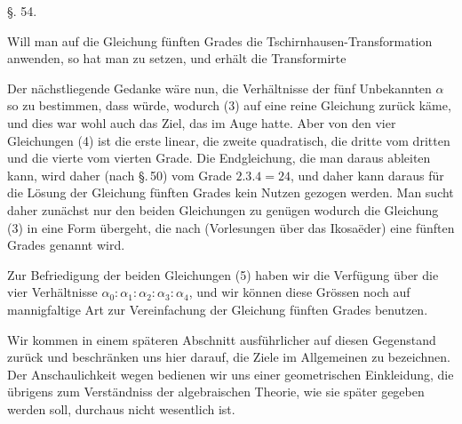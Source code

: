 
\begin{center}
§. 54.

\end{center}

Will man auf die Gleichung fünften Grades
die Tschirnhausen-Transformation anwenden, so hat man
zu setzen, und erhält die Transformirte

Der nächstliegende Gedanke wäre nun, die Verhältnisse der
fünf Unbekannten $\alpha$ so zu bestimmen, dass
würde, wodurch (3) auf eine reine Gleichung zurück käme, und
dies war wohl auch das Ziel, das  im Auge
hatte. Aber von den vier Gleichungen (4) ist die erste linear,
die zweite quadratisch, die dritte vom dritten und die vierte vom
vierten Grade. Die Endgleichung, die man daraus ableiten kann,
wird daher (nach \S.\,50) vom Grade $2.3.4 = 24$, und daher
kann daraus für die Lösung der Gleichung fünften Grades kein
Nutzen gezogen werden. Man sucht daher zunächst nur den
beiden Gleichungen zu genügen
wodurch die Gleichung (3) in eine Form übergeht, die nach
 (Vorlesungen über das Ikosaëder) eine  fünften Grades genannt wird.

Zur Befriedigung der beiden Gleichungen (5) haben wir die
Verfügung über die vier Verhältnisse $\alpha_0 : \alpha_1 : \alpha_2 : \alpha_3 : \alpha_4$, und wir
können diese Grössen noch auf mannigfaltige Art zur Vereinfachung der Gleichung fünften Grades benutzen.

Wir kommen in einem späteren Abschnitt ausführlicher auf
diesen Gegenstand zurück und beschränken uns hier darauf, die
Ziele im Allgemeinen zu bezeichnen. Der Anschaulichkeit wegen
bedienen wir uns einer geometrischen Einkleidung, die übrigens
zum Verständniss der algebraischen Theorie, wie sie später
gegeben werden soll, durchaus nicht wesentlich ist.
